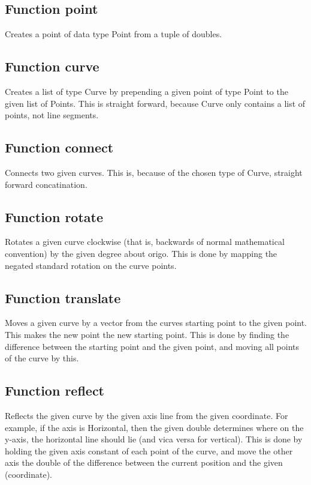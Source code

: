 \documentclass[a4paper, 10pt]{article}
\begin{document}
\subsection*{Function point}
Creates a point of data type Point from a tuple of doubles.

\subsection*{Function curve}
Creates a list of type Curve by prepending a given point of type Point to the given list of Points. This is straight forward, because Curve only contains a list of points, not line segments.

\subsection*{Function connect}
Connects two given curves. This is, because of the chosen type of Curve, straight forward concatination.

\subsection*{Function rotate}
Rotates a given curve clockwise (that is, backwards of normal mathematical convention) by the given degree about origo. This is done by mapping the negated standard rotation on the curve points.


\subsection*{Function translate}
Moves a given curve by a vector from the curves starting point to the given point. This makes the new point the new starting point. This is done by finding the difference between the starting point and the given point, and moving all points of the curve by this.

\subsection*{Function reflect}
Reflects the given curve by the given axis line from the given coordinate. For example, if the axis is Horizontal, then the given double determines where on the y-axis, the horizontal line should lie (and vica versa for vertical). This is done by holding the given axis constant of each point of the curve, and move the other axis the double of the difference between the current position and the given (coordinate).
\end{document}
